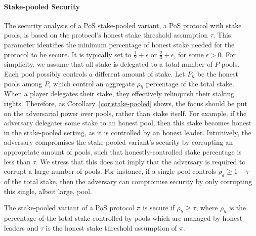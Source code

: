\paragraph{Stake-pooled Security}
The security analysis of a PoS stake-pooled variant, \ie a PoS protocol with
stake pools, is based on the protocol's honest stake threshold assumption
$\tau$. This parameter identifies the minimum percentage of honest stake needed
for the protocol to be secure. It is typically set to $\frac{1}{2} + \epsilon$
or $\frac{2}{3} + \epsilon$, for some $\epsilon > 0$. For simplicity, we assume
that all stake is delegated to a total number of $P$ pools. Each pool possibly
controls a different amount of stake.  Let $P_h$ be the honest pools among $P$,
which control an aggregate $\rho_h$ percentage of the total stake.  When a
player delegates their stake, they effectively relinquish their staking rights.
Therefore, as Corollary~\ref{cor:stake-pooled} shows, the focus should be put
on the adversarial power over pools, rather than stake itself.  For example, if
the adversary delegates some stake to an honest pool, then this stake becomes
honest in the stake-pooled setting, as it is controlled by an honest leader.
Intuitively, the adversary compromises the stake-pooled variant's security by
corrupting an appropriate amount of pools, such that honestly-controlled stake
percentage is less than $\tau$. We stress that this does not imply that the
adversary is required to corrupt a large number of pools. For instance, if a
single pool controls $\rho_a \geq 1-\tau$ of the total stake, then the
adversary can compromise security by only corrupting this single, albeit large,
pool.

\begin{corollary}\label{cor:stake-pooled}
    The stake-pooled variant of a PoS protocol $\pi$ is secure if $\rho_h \geq
    \tau$, where $\rho_h$ is the percentage of the total stake controlled by
    pools which are managed by honest leaders and $\tau$ is the honest stake
    threshold assumption of $\pi$.
\end{corollary}


